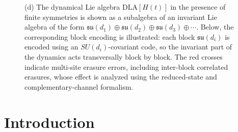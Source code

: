 \documentclass[10pt,twocolumn,superscriptaddress,aps,amsmath,amssymb,citeautoscript,floatfix,prx,longbibliography]{revtex4-2}
\newcounter{alg}
\theoremstyle{plain}
\theoremstyle{plain}
\theoremstyle{plain}
\theoremstyle{plain}
\theoremstyle{plain}
\theoremstyle{plain}
\begin{document}
\begin{figure}[htbp]
{    (d) The dynamical Lie algebra $\text{DLA}[H(t)]$ in the presence of finite symmetries is shown as a subalgebra of an invariant Lie algebra of the form $\mathfrak{su}(d_1)\oplus\mathfrak{su}(d_2)\oplus\mathfrak{su}(d_3)\oplus\cdots$. Below, the corresponding block encoding is illustrated: each block $\mathfrak{su}(d_i)$ is encoded using an $SU(d_i)$-covariant code, so the invariant part of the dynamics acts transversally block by block. The red crosses indicate multi-site erasure errors, including inter-block correlated erasures, whose effect is analyzed using the reduced-state and complementary-channel formalism.
}
\label{fig:theme}

\end{figure}

\section{Introduction}\label{sec:main_intro}
\end{document}
